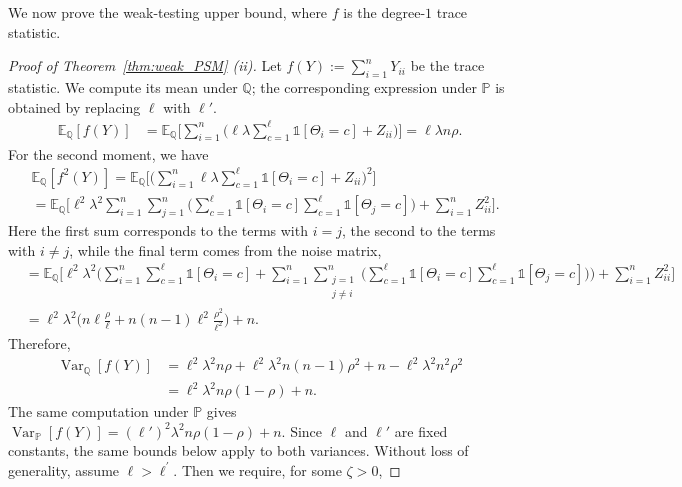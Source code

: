\documentclass[11pt, letterpaper]{article}
\numberwithin{equation}{section}
\newcommand{\PP}{\mathbb{P}}
\newcommand{\QQ}{\mathbb{Q}}
\begin{document}
\noindent We now prove the weak-testing upper bound, where $f$ is the degree-$1$ trace statistic.
\begin{proof}[Proof of Theorem~\ref{thm:weak_PSM} \textnormal{(ii)}]
  Let $f(Y):=\sum_{i=1}^n Y_{ii}$ be the trace statistic. We compute its mean under $\QQ$; the corresponding expression under $\PP$ is obtained by replacing $\ell$ with $\ell'$.
\begin{align*}
\mathbb{E}_{\mathbb{Q}}[f(Y)] &= \mathbb{E}_{\mathbb{Q}}\Big[\sum_{i=1}^n 
\Big( \ell \lambda \sum_{c=1}^\ell \mathds{1}[\Theta_i = c] + Z_{ii} \Big) \Big]=\ell \lambda n \rho.
\end{align*}
For the second moment, we have
\begin{align*}
    &\mathbb{E}_\mathbb{Q} [f^2(Y)] = \mathbb{E}_\mathbb{Q}
    \Big[\Big(\sum_{i=1}^n \ell\lambda \sum_{c=1}^{\ell}\mathds{1}[\Theta_i = c] + Z_{ii} \Big)^2\Big]\\
    &= \mathbb{E}_\mathbb{Q}
    \Big[\ell^2 \lambda^2 \sum_{i=1}^n \sum_{j=1}^n \Big(\sum_{c=1}^{\ell}\mathds{1}[\Theta_i = c]
    \sum_{c=1}^{\ell}\mathds{1}[\Theta_j = c] \Big)
    + \sum_{i=1}^n Z_{ii}^2\Big].
\end{align*}
Here the first sum corresponds to the terms with $i=j$, the second to the terms with $i\neq j$, while the final term comes from the noise matrix,
\begin{align*}
    &= \mathbb{E}_{\mathbb{Q}} 
    \Big[\ell^2\lambda^2 \Bigg( \sum_{i=1}^n \sum_{c=1}^{\ell}\mathds{1}[\Theta_i = c]
    +  \sum_{i=1}^n \sum_{\substack{j=1 \\ j \neq i}}^n \Big( \sum_{c=1}^{\ell}\mathds{1}[\Theta_i = c]
    \sum_{c=1}^{\ell}\mathds{1}[\Theta_j = c] \Big) \Bigg)
    + \sum_{i=1}^n Z_{ii}^2\Big]\\
    &= \ell^2\lambda^2  \Big(n \ell \frac{\rho}{\ell} + 
    n(n-1) \ell^{2}\frac{\rho^2}{\ell^2} \Big)
    + n.
\end{align*}
Therefore, 
\begin{align*}
    \operatorname{Var}_{\mathbb{Q}}[f(Y)] &=  \ell^{2}\lambda^2 n \rho + \ell^{2}\lambda^2 n(n-1) \rho^2 + n - \ell^{2} \lambda^2 n^2 \rho^2\\
    &= \ell^{2}\lambda^2n\rho(1-\rho) + n.
\end{align*}
The same computation under $\mathbb{P}$ gives $\operatorname{Var}_\mathbb{P}[f(Y)]=
(\ell')^2\lambda^2 n\rho(1-\rho)+n.$
Since $\ell$ and $\ell'$ are fixed constants, the same bounds below apply to both variances.
Without loss of generality, assume $\ell > \ell^{\prime}$. Then we require, for some $\zeta > 0$,

\end{proof}
\end{document}

